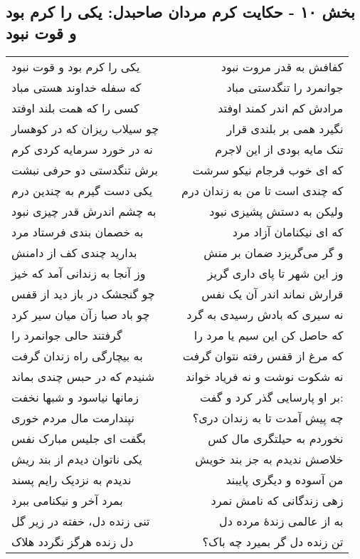 \begin{center}
\section*{بخش ۱۰ - حکایت کرم مردان صاحبدل: یکی را کرم بود و قوت نبود}
\label{sec:010}
\begin{longtable}{l p{0.5cm} r}
یکی را کرم بود و قوت نبود
&&
کفافش به قدر مروت نبود
\\
که سفله خداوند هستی مباد
&&
جوانمرد را تنگدستی مباد
\\
کسی را که همت بلند اوفتد
&&
مرادش کم اندر کمند اوفتد
\\
چو سیلاب ریزان که در کوهسار
&&
نگیرد همی بر بلندی قرار
\\
نه در خورد سرمایه کردی کرم
&&
تنک مایه بودی از این لاجرم
\\
برش تنگدستی دو حرفی نبشت
&&
که ای خوب فرجام نیکو سرشت
\\
یکی دست گیرم به چندین درم
&&
که چندی است تا من به زندان درم
\\
به چشم اندرش قدر چیزی نبود
&&
ولیکن به دستش پشیزی نبود
\\
به خصمان بندی فرستاد مرد
&&
که ای نیکنامان آزاد مرد
\\
بدارید چندی کف از دامنش
&&
و گر می‌گریزد ضمان بر منش
\\
وز آنجا به زندانی آمد که خیز
&&
وز این شهر تا پای داری گریز
\\
چو گنجشک در باز دید از قفس
&&
قرارش نماند اندر آن یک نفس
\\
چو باد صبا زآن میان سیر کرد
&&
نه سیری که بادش رسیدی به گرد
\\
گرفتند حالی جوانمرد را
&&
که حاصل کن این سیم یا مرد را
\\
به بیچارگی راه زندان گرفت
&&
که مرغ از قفس رفته نتوان گرفت
\\
شنیدم که در حبس چندی بماند
&&
نه شکوت نوشت و نه فریاد خواند
\\
زمانها نیاسود و شبها نخفت
&&
بر او پارسایی گذر کرد و گفت:
\\
نپندارمت مال مردم خوری
&&
چه پیش آمدت تا به زندان دری؟
\\
بگفت ای جلیس مبارک نفس
&&
نخوردم به حیلتگری مال کس
\\
یکی ناتوان دیدم از بند ریش
&&
خلاصش ندیدم به جز بند خویش
\\
ندیدم به نزدیک رایم پسند
&&
من آسوده و دیگری پایبند
\\
بمرد آخر و نیکنامی ببرد
&&
زهی زندگانی که نامش نمرد
\\
تنی زنده دل، خفته در زیر گل
&&
به از عالمی زندهٔ مرده دل
\\
دل زنده هرگز نگردد هلاک
&&
تن زنده دل گر بمیرد چه باک؟
\\
\end{longtable}
\end{center}
